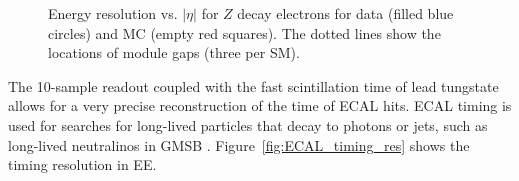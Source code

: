 \documentclass[dissertation.tex]{subfiles}
\begin{document}
\begin{figure}
	\centering
	\hspace{1cm}
	\caption{Energy resolution vs. $|\eta|$ for $Z$ decay electrons for data (filled blue circles) and MC (empty red squares).  The dotted lines show the locations of module gaps (three per SM).}
	\label{fig:ECAL_res_vs_eta}
\end{figure}

The 10-sample readout coupled with the fast scintillation time of lead tungstate allows for a very precise reconstruction of the time of ECAL hits.  ECAL timing is used for searches for long-lived particles that decay to photons or jets, such as long-lived neutralinos in GMSB \cite{CMS-PAS-EXO-11-067}.  Figure~\ref{fig:ECAL_timing_res} shows the timing resolution in EE.
\end{document}
